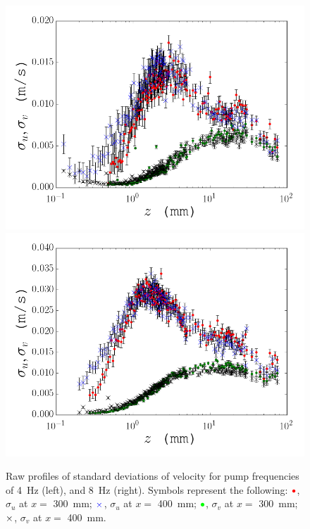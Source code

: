 \documentclass[12pt,oneside,a4paper]{article}
\begin{document}
\begin{figure}[!h]
\centering
\includegraphics[width=0.5\linewidth]{images/LDA_profileImages/std_4hz.png}\hfill
\includegraphics[width=0.5\linewidth]{images/LDA_profileImages/std_8hz.png}
\caption{Raw profiles of standard deviations of velocity for pump frequencies of \SI{4}{Hz} (left), and \SI{8}{Hz} (right). Symbols represent the following: $\color{red}{\bullet}$, $\sigma_u$ at $x=$ \SI{300}{mm}; $\color{blue} \times $, $\sigma_u$ at $x=$ \SI{400}{mm}; $\color{green}{\bullet}$, $\sigma_v$ at $x=$ \SI{300}{mm}; $\color{black} \times $, $\sigma_v$ at $x=$ \SI{400}{mm}.}
\label{figure:experiments:profiles:std}
\end{figure}
\end{document}
